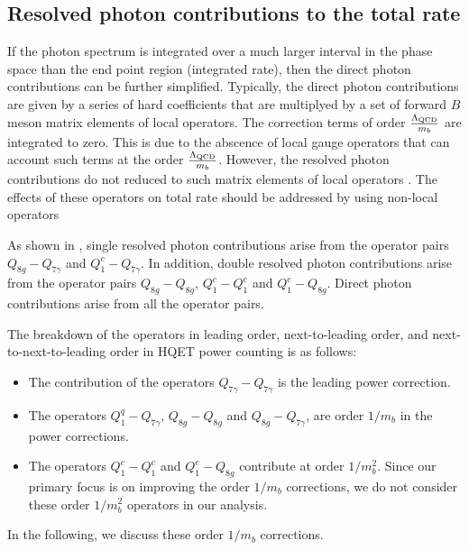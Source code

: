 \subsection{Resolved photon contributions to the total rate}
If the photon spectrum is integrated over a much larger interval in the phase space than the end point region (integrated rate), then the direct photon contributions can be further simplified. Typically, the direct photon contributions are given by a series of hard coefficients that are multiplyed by a set of forward $B$ meson matrix elements of local operators. The correction terms of order $\frac{\Lambda_{\rm{QCD}}}{m_b}$ are integrated to zero. This is due to the abscence of local gauge operators that can account such terms at the order $\frac{\Lambda_{\rm{QCD}}}{m_b}$. However, the resolved photon contributions do not reduced to such matrix elements of local operators \cite{Benzke:2010js}. The effects of these operators on total rate should be addressed by using non-local operators \cite{Lee:2006wn}\par
As shown in \cite{Benzke:2010js}, single resolved photon contributions arise from the operator pairs $Q_{8g}-Q_{7\gamma}$ and $Q_{1}^{c}-Q_{7\gamma}$. In addition, double resolved photon contributions arise from the operator pairs  $Q_{8g}-Q_{8g}$, $Q_{1}^{c}-Q_{1}^{c}$ and $Q_{1}^{c}-Q_{8g}$. Direct photon contributions arise from all the operator pairs.\par
The breakdown of the operators in leading order, next-to-leading order, and next-to-next-to-leading order in HQET power counting is as follows:
\begin{itemize}
  \item The contribution of the operators  $Q_{7\gamma}-Q_{7\gamma}$ is the leading power correction. 
  \item The operators $Q_{1}^{q}-Q_{7\gamma}$, $Q_{8g}-Q_{8g}$ and $Q_{8g}-Q_{7\gamma}$, are order $1/m_{b}$ in the power corrections. 
  \item The operators $Q_{1}^{c}-Q_{1}^{c}$ and $Q_{1}^{c}-Q_{8g}$ contribute at order $1/m^{2}_{b}$. Since our primary focus is on improving the order $1/m_b$ corrections, we do not consider these order $1/m^{2}_{b}$ operators in our analysis.
\end{itemize}
In the following, we discuss these order  $1/m_b$ corrections.
